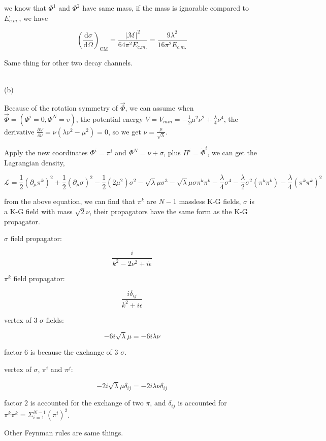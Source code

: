 \documentclass[11pt]{article} %
\begin{document}
we know that $\Phi^1$ and $\Phi^2$ have same mass, if the mass is ignorable compared to $E_{c.m.}$, we have

\[
    \left(\frac{\mathrm{d} \sigma}{\mathrm{d} \Omega}\right)_{\mathrm{CM}}=\frac{|\mathcal{M}|^{2}}{64 \pi^{2} E_{c.m.}} = \frac{9 \lambda^2}{16 \pi^2 E_{c.m.}}    
\]

Same thing for other two decay channels.

~\\
\noindent (b)

Because of the rotation symmetry of $\vec{\Phi}$, we can assume when $\vec{\Phi} = (\Phi^i = 0, \Phi^N = v)$, the potential energy $V = V_{min} = -\frac{1}{2} \mu^2 \nu^2 + \frac{\lambda}{4} \nu^4$, the derivative $\frac{\partial V}{\partial \nu} = \nu (\lambda \nu^2 - \mu^2) = 0$, so we get $\nu = \frac{\mu}{\sqrt{\lambda}}$.

Apply the new coordinates $\Phi^i = \pi^i$ and $\Phi^N = \nu + \sigma$, plus $\Pi^i = \dot{\Phi}^i $, we can get the Lagrangian density,

\[
    \mathcal{L}=\frac{1}{2}\left(\partial_{\mu} \pi^{k}\right)^{2}+\frac{1}{2}\left(\partial_{\mu} \sigma\right)^{2}-\frac{1}{2}\left(2 \mu^{2}\right) \sigma^{2}-\sqrt{\lambda} \mu \sigma^{3}-\sqrt{\lambda} \mu \sigma \pi^{k} \pi^{k} -\frac{\lambda}{4} \sigma^{4}-\frac{\lambda}{2} \sigma^{2}\left(\pi^{k} \pi^{k}\right)-\frac{\lambda}{4}\left(\pi^{k} \pi^{k}\right)^{2}
\]

from the above equation, we can find that $\pi^k$ are $N-1$ massless K-G fields, $\sigma$ is a K-G field with mass $\sqrt{2} \nu$, their propagators have the same form as the K-G propagator.

$\sigma$ field propagator:

\[
    \frac{i}{k^2 - 2\nu^2 +i \epsilon}
\]

$\pi^k$ field propagator:

\[
    \frac{i \delta_{ij}}{k^2 + i \epsilon}    
\]

vertex of $3$ $\sigma$ fields:

\[
    - 6 i \sqrt{\lambda} \mu = - 6 i \lambda \nu    
\]

factor $6$ is because the exchange of $3$ $\sigma$.

vertex of $\sigma$, $\pi^i$ and $\pi^j$:

\[
    - 2 i \sqrt{\lambda} \mu \delta_{ij} = - 2 i \lambda \nu \delta_{ij}
\]

factor $2$ is accounted for the exchange of two $\pi$, and $\delta_{ij}$ is accounted for $\pi^k \pi^k = \Sigma_{i = 1}^{N-1} (\pi^i)^2 $.

Other Feynman rules are same things.
\end{document}
